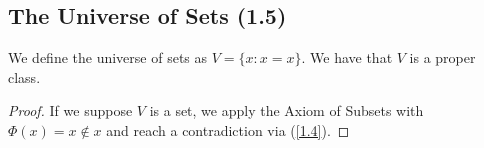 \subsection{The Universe of Sets (1.5)} \label{1.5}

We define the universe of sets as $V = \{x : x = x\}$.
We have that $V$ is a proper class.
\begin{proof}
    If we suppose $V$ is a set, we apply the Axiom of Subsets with
    $\Phi(x) = x \notin x$ and reach a contradiction via (\ref{1.4}).
\end{proof}

